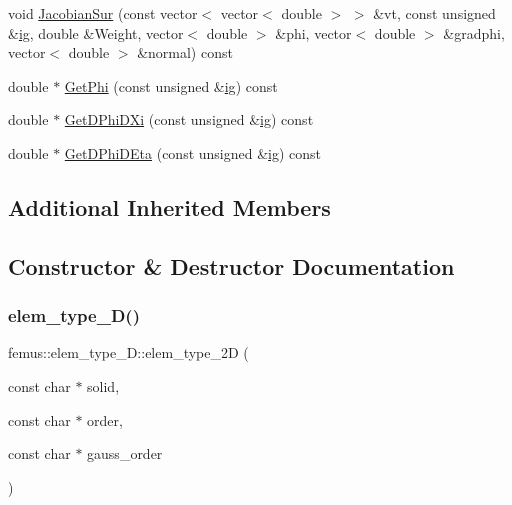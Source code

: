 \begin{DoxyCompactItemize}
\item 
void \mbox{\hyperlink{classfemus_1_1elem__type__2_d_a6da2427389820a069cc62fa014262c44}{Jacobian\+Sur}} (const vector$<$ vector$<$ double $>$ $>$ \&vt, const unsigned \&\mbox{\hyperlink{namespacefemus_a6df31099f676311de214a312d7043941}{ig}}, double \&Weight, vector$<$ double $>$ \&phi, vector$<$ double $>$ \&gradphi, vector$<$ double $>$ \&normal) const
\item 
double $\ast$ \mbox{\hyperlink{classfemus_1_1elem__type__2_d_a9e2ed95e14dbbf28d6399c50ba83ebe9}{Get\+Phi}} (const unsigned \&\mbox{\hyperlink{namespacefemus_a6df31099f676311de214a312d7043941}{ig}}) const
\item 
double $\ast$ \mbox{\hyperlink{classfemus_1_1elem__type__2_d_a11838ba0522b27348770989555114c94}{Get\+D\+Phi\+D\+Xi}} (const unsigned \&\mbox{\hyperlink{namespacefemus_a6df31099f676311de214a312d7043941}{ig}}) const
\item 
double $\ast$ \mbox{\hyperlink{classfemus_1_1elem__type__2_d_a3a77bc47f11a128210ed5c22a1179cc4}{Get\+D\+Phi\+D\+Eta}} (const unsigned \&\mbox{\hyperlink{namespacefemus_a6df31099f676311de214a312d7043941}{ig}}) const
\end{DoxyCompactItemize}
\subsection*{Additional Inherited Members}


\subsection{Constructor \& Destructor Documentation}
\mbox{\label{classfemus_1_1elem__type__2_d_a876b8c2f0e759a70fb821ccfebd41994}} 
\subsubsection{\texorpdfstring{elem\+\_\+type\+\_\+D()}{elem\_type\_2D()}}
{\footnotesize\ttfamily femus\+::elem\+\_\+type\+\_\+D\+::elem\+\_\+type\+\_\+2D (\begin{DoxyParamCaption}\item[{const char $\ast$}]{solid,  }\item[{const char $\ast$}]{order,  }\item[{const char $\ast$}]{gauss\+\_\+order }\end{DoxyParamCaption})}

